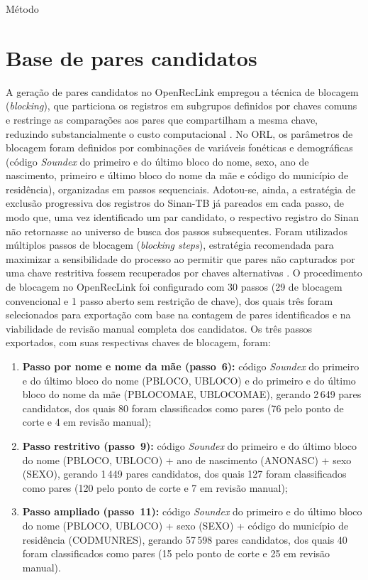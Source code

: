 \begin{chapter}{Método}
\section{Base de pares candidatos}\label{sec:base-pares}

A geração de pares candidatos no OpenRecLink empregou a técnica de blocagem (\textit{blocking}), que particiona os registros em subgrupos definidos por chaves comuns e restringe as comparações aos pares que compartilham a mesma chave, reduzindo substancialmente o custo computacional \cite{Christen2012book}. No ORL, os parâmetros de blocagem foram definidos por combinações de variáveis fonéticas e demográficas (código \textit{Soundex} do primeiro e do último bloco do nome, sexo, ano de nascimento, primeiro e último bloco do nome da mãe e código do município de residência), organizadas em passos sequenciais. Adotou-se, ainda, a estratégia de exclusão progressiva dos registros do Sinan-TB já pareados em cada passo, de modo que, uma vez identificado um par candidato, o respectivo registro do Sinan não retornasse ao universo de busca dos passos subsequentes. Foram utilizados múltiplos passos de blocagem (\textit{blocking steps}), estratégia recomendada para maximizar a sensibilidade do processo ao permitir que pares não capturados por uma chave restritiva fossem recuperados por chaves alternativas \cite{Coeli2002blocking}. O procedimento de blocagem no OpenRecLink foi configurado com 30 passos (29 de blocagem convencional e 1 passo aberto sem restrição de chave), dos quais três foram selecionados para exportação com base na contagem de pares identificados e na viabilidade de revisão manual completa dos candidatos. Os três passos exportados, com suas respectivas chaves de blocagem, foram:

\begin{enumerate}
\item \textbf{Passo por nome e nome da mãe (passo~6):} código \textit{Soundex} do primeiro e do último bloco do nome (PBLOCO, UBLOCO) e do primeiro e do último bloco do nome da mãe (PBLOCOMAE, UBLOCOMAE), gerando 2\,649 pares candidatos, dos quais 80 foram classificados como pares (76 pelo ponto de corte e 4 em revisão manual);
\item \textbf{Passo restritivo (passo~9):} código \textit{Soundex} do primeiro e do último bloco do nome (PBLOCO, UBLOCO) + ano de nascimento (ANONASC) + sexo (SEXO), gerando 1\,449 pares candidatos, dos quais 127 foram classificados como pares (120 pelo ponto de corte e 7 em revisão manual);
\item \textbf{Passo ampliado (passo~11):} código \textit{Soundex} do primeiro e do último bloco do nome (PBLOCO, UBLOCO) + sexo (SEXO) + código do município de residência (CODMUNRES), gerando 57\,598 pares candidatos, dos quais 40 foram classificados como pares (15 pelo ponto de corte e 25 em revisão manual).
\end{enumerate}


\end{chapter}
